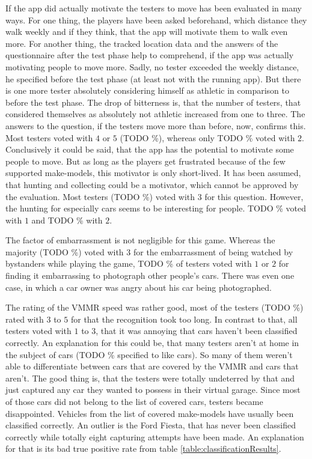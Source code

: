 If the app did actually motivate the testers to move has been evaluated in many ways. For one thing, the players have been asked beforehand, which distance they walk weekly and if they think, that the app will motivate them to walk even more. For another thing, the tracked location data and the answers of the questionnaire after the test phase help to comprehend, if the app was actually motivating people to move more. Sadly, no tester exceeded the weekly distance, he specified before the test phase (at least not with the running app). But there is one more tester absolutely considering himself as athletic in comparison to before the test phase. The drop of bitterness is, that the number of testers, that considered themselves as absolutely not athletic increased from one to three. The answers to the question, if the testers move more than before, now, confirms this. Most testers voted with $4$ or $5$ (TODO \%), whereas only TODO \% voted with $2$. Conclusively it could be said, that the app has the potential to motivate some people to move. But as long as the players get frustrated because of the few supported make-models, this motivator is only short-lived. It has been assumed, that hunting and collecting could be a motivator, which cannot be approved by the evaluation. Most testers (TODO \%) voted with $3$ for this question. However, the hunting for especially cars seems to be interesting for people. TODO \% voted with $1$ and TODO \% with $2$.

The factor of embarrassment is not negligible for this game. Whereas the majority (TODO \%) voted with $3$ for the embarrassment of being watched by bystanders while playing the game, TODO \% of testers voted with $1$ or $2$ for finding it embarrassing to photograph other people's cars. There was even one case, in which a car owner was angry about his car being photographed.

The rating of the VMMR speed was rather good, most of the testers (TODO \%) rated with $3$ to $5$ for that the recognition took too long. In contrast to that, all testers voted with $1$ to $3$, that it was annoying that cars haven't been classified correctly. An explanation for this could be, that many testers aren't at home in the subject of cars (TODO \% specified to like cars). So many of them weren't able to differentiate between cars that are covered by the VMMR and cars that aren't. The good thing is, that the testers were totally undeterred by that and just captured any car they wanted to possess in their virtual garage. Since most of those cars did not belong to the list of covered cars, testers became disappointed. Vehicles from the list of covered make-models have usually been classified correctly. An outlier is the Ford Fiesta, that has never been classified correctly while totally eight capturing attempts have been made. An explanation for that is its bad true positive rate from table \ref{table:classificationResults}.

